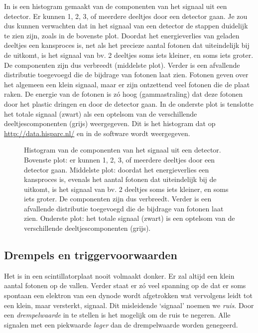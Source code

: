 In  is een histogram gemaakt van de
componenten van het signaal uit een \hisparc detector.  Er kunnen 1, 2, 3,
of meerdere deeltjes door een detector gaan.  Je zou dus kunnen verwachten
dat in het signaal van een \hisparc detector de stappen duidelijk te zien
zijn, zoals in de bovenste plot.  Doordat het energieverlies van geladen
deeltjes een kansproces is, net als het precieze aantal fotonen dat
uiteindelijk bij de \pmt uitkomt, is het signaal van bv. 2 deeltjes soms
iets kleiner, en soms iets groter.  De componenten zijn dus verbreedt
(middelste plot).  Verder is een afvallende distributie toegevoegd die de
bijdrage van fotonen laat zien.  Fotonen geven over het algemeen een klein
signaal, maar er zijn ontzettend veel fotonen die de plaat raken.  De
energie van de fotonen is zó hoog (gammastraling) dat deze fotonen door
het plastic dringen en door de detector gaan.  In de onderste plot is
tenslotte het totale signaal (zwart) als een optelsom van de verschillende
deeltjescomponenten (grijs) weergegeven.  Dit is het histogram dat op
\url{http://data.hisparc.nl/} en in de \daq software wordt weergegeven.

\begin{figure}
\centering

\caption{Histogram van de componenten van het signaal uit een \hisparc
detector.  Bovenste plot: er kunnen 1, 2, 3, of meerdere deeltjes door een
detector gaan.  Middelste plot: doordat het energieverlies een kansproces
is, evenals het aantal fotonen dat uiteindelijk bij de \pmt uitkomt, is
het signaal van bv. 2 deeltjes soms iets kleiner, en soms iets groter.  De
componenten zijn dus verbreedt.  Verder is een afvallende distributie
toegevoegd die de bijdrage van fotonen laat zien.  Onderste plot: het
totale signaal (zwart) is een optelsom van de verschillende
deeltjescomponenten (grijs).}
\label{fig:spectrum_componenten}
\end{figure}


\subsection{Drempels en triggervoorwaarden}

Het is in een scintillatorplaat nooit volmaakt donker.  Er zal altijd een
klein aantal fotonen op de \pmt vallen.  Verder staat er zó veel spanning
op de \pmt dat er soms spontaan een elektron van een dynode wordt
afgetrokken wat vervolgens leidt tot een klein, maar versterkt, signaal.
Dit misleidende `signaal' noemen we \emph{ruis}.  Door een
\emph{drempelwaarde} in te stellen is het mogelijk om de ruis te negeren.
Alle signalen met een piekwaarde \emph{lager} dan de drempelwaarde worden
genegeerd.

